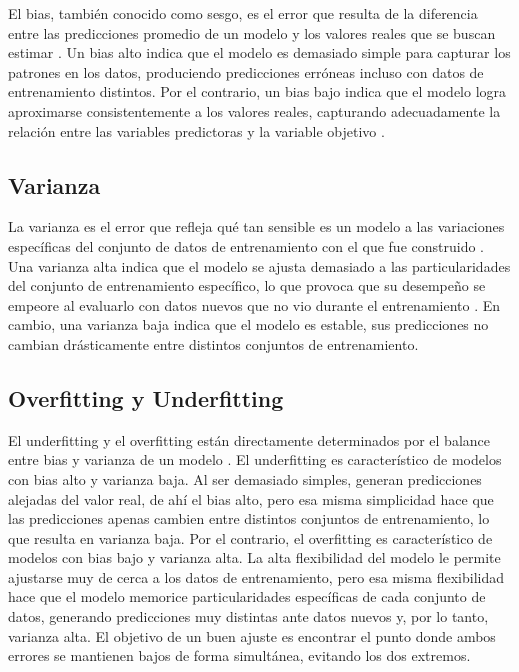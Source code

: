\documentclass[10pt,journal,compsoc]{IEEEtran}
\begin{document}
El bias, también conocido como sesgo, es el error que resulta de la diferencia entre las predicciones promedio de un modelo y los valores reales que se buscan estimar \cite{bias01}. Un bias alto indica que el modelo es demasiado simple para capturar los patrones en los datos, produciendo predicciones erróneas incluso con datos de entrenamiento distintos. Por el contrario, un bias bajo indica que el modelo logra aproximarse consistentemente a los valores reales, capturando adecuadamente la relación entre las variables predictoras y la variable objetivo \cite{bias02}.


\subsection{Varianza}

La varianza es el error que refleja qué tan sensible es un modelo a las variaciones específicas del conjunto de datos de entrenamiento con el que fue construido \cite{bias01}. Una varianza alta indica que el modelo se ajusta demasiado a las particularidades del conjunto de entrenamiento específico, lo que provoca que su desempeño se empeore al evaluarlo con datos nuevos que no vio durante el entrenamiento \cite{bias02}. En cambio, una varianza baja indica que el modelo es estable, sus predicciones no cambian drásticamente entre distintos conjuntos de entrenamiento.

\subsection{Overfitting y Underfitting}

El underfitting y el overfitting están directamente determinados por el balance entre bias y varianza de un modelo \cite{ibm01}. El underfitting es característico de modelos con bias alto y varianza baja. Al ser demasiado simples, generan predicciones alejadas del valor real, de ahí el bias alto, pero esa misma simplicidad hace que las predicciones apenas cambien entre distintos conjuntos de entrenamiento, lo que resulta en varianza baja. Por el contrario, el overfitting es característico de modelos con bias bajo y varianza alta. La alta flexibilidad del modelo le permite ajustarse muy de cerca a los datos de entrenamiento, pero esa misma flexibilidad hace que el modelo memorice particularidades específicas de cada conjunto de datos, generando predicciones muy distintas ante datos nuevos y, por lo tanto, varianza alta. El objetivo de un buen ajuste es encontrar el punto donde ambos errores se mantienen bajos de forma simultánea, evitando los dos extremos.
\end{document}
